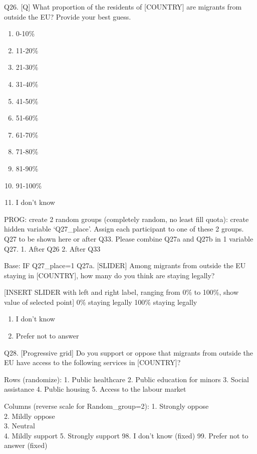 \documentclass[
  12pt,
  a4paper,
]{article}
\providecommand{\tightlist}{%
  \setlength{\itemsep}{0pt}\setlength{\parskip}{0pt}}
\begin{document}
Q26. {[}Q{]} What proportion of the residents of {[}COUNTRY{]} are migrants from outside the EU?
Provide your best guess.

\begin{enumerate}
\def\labelenumi{\arabic{enumi}.}
\tightlist
\item
  0-10\%
\item
  11-20\%
\item
  21-30\%
\item
  31-40\%
\item
  41-50\%
\item
  51-60\%
\item
  61-70\%
\item
  71-80\%
\item
  81-90\%
\item
  91-100\%
\item
  I don't know
\end{enumerate}

PROG: create 2 random groups (completely random, no least fill quota): create hidden variable `Q27\_place'. Assign each participant to one of these 2 groups. Q27 to be shown here or after Q33. Please combine Q27a and Q27b in 1 variable Q27.
1. After Q26
2. After Q33

Base: IF Q27\_place=1
Q27a. {[}SLIDER{]} Among migrants from outside the EU staying in {[}COUNTRY{]}, how many do you think are staying legally?

{[}INSERT SLIDER with left and right label, ranging from 0\% to 100\%, show value of selected point{]}
0\% staying legally 100\% staying legally

\begin{enumerate}
\def\labelenumi{\arabic{enumi}.}
\setcounter{enumi}{97}
\tightlist
\item
  I don't know
\item
  Prefer not to answer
\end{enumerate}

Q28. {[}Progressive grid{]} Do you support or oppose that migrants from outside the EU have access to the following services in {[}COUNTRY{]}?

Rows (randomize):
1. Public healthcare
2. Public education for minors
3. Social assistance
4. Public housing
5. Access to the labour market

Columns (reverse scale for Random\_group=2):
1. Strongly oppose\\
2. Mildly oppose\\
3. Neutral\\
4. Mildly support
5. Strongly support
98. I don't know (fixed)
99. Prefer not to answer (fixed)
\end{document}
